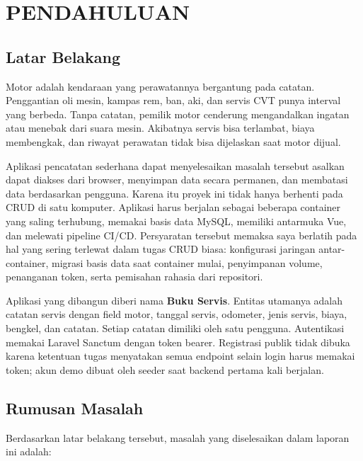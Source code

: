\documentclass[12pt,a4paper,oneside]{book}
\begin{document}
\chapter{PENDAHULUAN}
\label{chap:pendahuluan}

\section{Latar Belakang}

Motor adalah kendaraan yang perawatannya bergantung pada catatan. Penggantian oli
mesin, kampas rem, ban, aki, dan servis CVT punya interval yang berbeda. Tanpa
catatan, pemilik motor cenderung mengandalkan ingatan atau menebak dari suara mesin.
Akibatnya servis bisa terlambat, biaya membengkak, dan riwayat perawatan tidak bisa
dijelaskan saat motor dijual.

Aplikasi pencatatan sederhana dapat menyelesaikan masalah tersebut asalkan dapat
diakses dari browser, menyimpan data secara permanen, dan membatasi data berdasarkan
pengguna. Karena itu proyek ini tidak hanya berhenti pada CRUD di satu komputer.
Aplikasi harus berjalan sebagai beberapa container yang saling terhubung, memakai
basis data MySQL, memiliki antarmuka Vue, dan melewati pipeline CI/CD. Persyaratan
tersebut memaksa saya berlatih pada hal yang sering terlewat dalam tugas CRUD biasa:
konfigurasi jaringan antar-container, migrasi basis data saat container mulai,
penyimpanan volume, penanganan token, serta pemisahan rahasia dari repositori.

Aplikasi yang dibangun diberi nama \textbf{Buku Servis}. Entitas utamanya adalah
catatan servis dengan field motor, tanggal servis, odometer, jenis servis, biaya,
bengkel, dan catatan. Setiap catatan dimiliki oleh satu pengguna. Autentikasi memakai
Laravel Sanctum dengan token bearer. Registrasi publik tidak dibuka karena ketentuan
tugas menyatakan semua endpoint selain login harus memakai token; akun demo dibuat
oleh seeder saat backend pertama kali berjalan.

\section{Rumusan Masalah}

Berdasarkan latar belakang tersebut, masalah yang diselesaikan dalam laporan ini
adalah:
\end{document}
